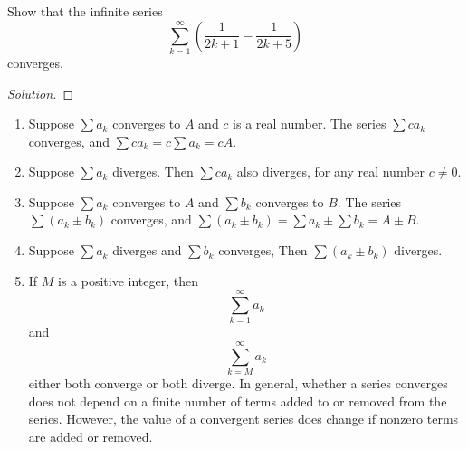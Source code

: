 \documentclass[compacto,10pt,comentarios]{aleph-notas}
\begin{document}
\begin{ejer}
    Show that the infinite series
    $$
        \sum_{k=1}^{\infty} \left( \frac{1}{2k+1} - \frac{1}{2k+5} \right)
    $$
    converges.
\end{ejer}
\begin{proof}[Solution]
    
\end{proof}

\begin{teo}
    \begin{enumerate}
        \item Suppose $\sum a_k$ converges to $A$ and $c$ is a real number. The series $\sum c a_k$ converges, and $\sum c a_k = c \sum a_k = c A$. 
        \item Suppose $\sum a_k$ diverges. Then $\sum c a_k$ also diverges, for any real number $c \neq 0$.
        \item Suppose $\sum a_k$ converges to $A$ and $\sum b_k$ converges to $B$. The series $\sum (a_k \pm b_k)$ converges, and $\sum(a_k \pm b_k) = \sum a_k \pm \sum b_k = A \pm B$.
        \item Suppose $\sum a_k$ diverges and $\sum b_k$ converges, Then $\sum (a_k \pm b_k)$ diverges.
        \item If $M$ is a positive integer, then
        $$
            \sum_{k=1}^{\infty} a_k
        $$
        and
        $$
            \sum_{k=M}^{\infty} a_k
        $$
        either both converge or both diverge. In general, whether a series converges does not depend on a finite number of terms added to or removed from the series. However, the value of a convergent series does change if nonzero terms are added or removed.
    \end{enumerate}
\end{teo}
\end{document}
